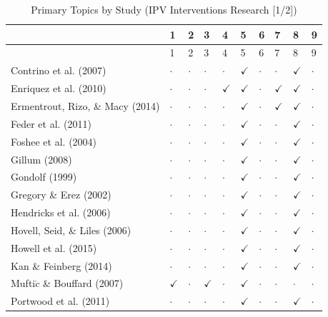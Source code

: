 \documentclass[11pt,]{tufte-book}
\begin{document}
\newpage

\begin{longtable}[]{@{}llllllllll@{}}
\caption{Primary Topics by Study (IPV Interventions Research {[}1/2{]})
\label{tbl:ks3tp}}\tabularnewline
\toprule
& 1 & 2 & 3 & 4 & 5 & 6 & 7 & 8 & 9\tabularnewline
\midrule
\endfirsthead
\toprule
& 1 & 2 & 3 & 4 & 5 & 6 & 7 & 8 & 9\tabularnewline
\midrule
\endhead
Contrino et al. (2007) & \(\cdot\) & \(\cdot\) & \(\cdot\) & \(\cdot\) &
\(\checkmark\) & \(\cdot\) & \(\cdot\) & \(\checkmark\) &
\(\cdot\)\tabularnewline
Enriquez et al. (2010) & \(\cdot\) & \(\cdot\) & \(\cdot\) &
\(\checkmark\) & \(\checkmark\) & \(\cdot\) & \(\checkmark\) &
\(\checkmark\) & \(\cdot\)\tabularnewline
Ermentrout, Rizo, \& Macy (2014) & \(\cdot\) & \(\cdot\) & \(\cdot\) &
\(\cdot\) & \(\checkmark\) & \(\cdot\) & \(\checkmark\) & \(\checkmark\)
& \(\cdot\)\tabularnewline
Feder et al. (2011) & \(\cdot\) & \(\cdot\) & \(\cdot\) & \(\cdot\) &
\(\checkmark\) & \(\cdot\) & \(\cdot\) & \(\checkmark\) &
\(\cdot\)\tabularnewline
Foshee et al. (2004) & \(\cdot\) & \(\cdot\) & \(\cdot\) & \(\cdot\) &
\(\checkmark\) & \(\cdot\) & \(\cdot\) & \(\checkmark\) &
\(\cdot\)\tabularnewline
Gillum (2008) & \(\cdot\) & \(\cdot\) & \(\cdot\) & \(\cdot\) &
\(\checkmark\) & \(\cdot\) & \(\cdot\) & \(\checkmark\) &
\(\cdot\)\tabularnewline
Gondolf (1999) & \(\cdot\) & \(\cdot\) & \(\cdot\) & \(\cdot\) &
\(\checkmark\) & \(\cdot\) & \(\cdot\) & \(\checkmark\) &
\(\cdot\)\tabularnewline
Gregory \& Erez (2002) & \(\cdot\) & \(\cdot\) & \(\cdot\) & \(\cdot\) &
\(\checkmark\) & \(\cdot\) & \(\cdot\) & \(\checkmark\) &
\(\cdot\)\tabularnewline
Hendricks et al. (2006) & \(\cdot\) & \(\cdot\) & \(\cdot\) & \(\cdot\)
& \(\checkmark\) & \(\cdot\) & \(\cdot\) & \(\checkmark\) &
\(\cdot\)\tabularnewline
Hovell, Seid, \& Liles (2006) & \(\cdot\) & \(\cdot\) & \(\cdot\) &
\(\cdot\) & \(\checkmark\) & \(\cdot\) & \(\cdot\) & \(\checkmark\) &
\(\cdot\)\tabularnewline
Howell et al. (2015) & \(\cdot\) & \(\cdot\) & \(\cdot\) & \(\cdot\) &
\(\checkmark\) & \(\cdot\) & \(\cdot\) & \(\checkmark\) &
\(\cdot\)\tabularnewline
Kan \& Feinberg (2014) & \(\cdot\) & \(\cdot\) & \(\cdot\) & \(\cdot\) &
\(\checkmark\) & \(\cdot\) & \(\cdot\) & \(\checkmark\) &
\(\cdot\)\tabularnewline
Mufti\(\acute{c}\) \& Bouffard (2007) & \(\checkmark\) & \(\cdot\) &
\(\checkmark\) & \(\cdot\) & \(\checkmark\) & \(\cdot\) & \(\cdot\) &
\(\cdot\) & \(\cdot\)\tabularnewline
Portwood et al. (2011) & \(\cdot\) & \(\cdot\) & \(\cdot\) & \(\cdot\) &
\(\checkmark\) & \(\cdot\) & \(\cdot\) & \(\checkmark\) &
\(\cdot\)\tabularnewline

\end{longtable}
\end{document}
